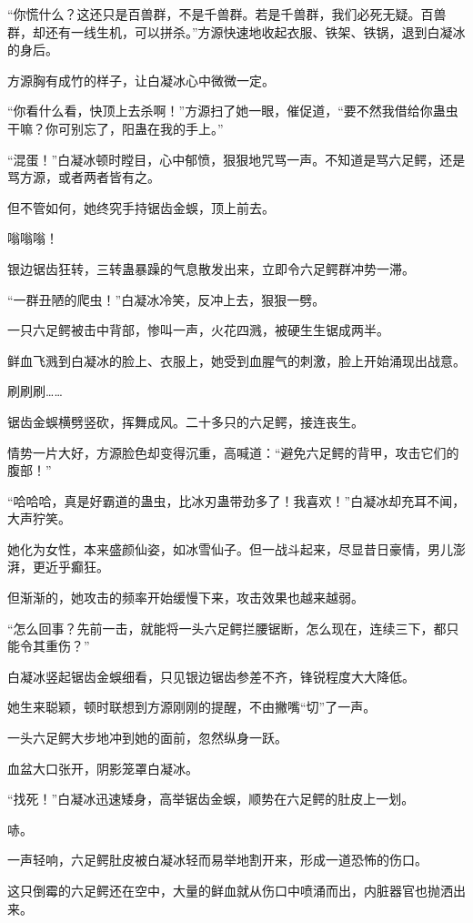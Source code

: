 \begin{this_body}
“你慌什么？这还只是百兽群，不是千兽群。若是千兽群，我们必死无疑。百兽群，却还有一线生机，可以拼杀。”方源快速地收起衣服、铁架、铁锅，退到白凝冰的身后。

方源胸有成竹的样子，让白凝冰心中微微一定。

“你看什么看，快顶上去杀啊！”方源扫了她一眼，催促道，“要不然我借给你蛊虫干嘛？你可别忘了，阳蛊在我的手上。”

“混蛋！”白凝冰顿时瞠目，心中郁愤，狠狠地咒骂一声。不知道是骂六足鳄，还是骂方源，或者两者皆有之。

但不管如何，她终究手持锯齿金蜈，顶上前去。

嗡嗡嗡！

银边锯齿狂转，三转蛊暴躁的气息散发出来，立即令六足鳄群冲势一滞。

“一群丑陋的爬虫！”白凝冰冷笑，反冲上去，狠狠一劈。

一只六足鳄被击中背部，惨叫一声，火花四溅，被硬生生锯成两半。

鲜血飞溅到白凝冰的脸上、衣服上，她受到血腥气的刺激，脸上开始涌现出战意。

刷刷刷……

锯齿金蜈横劈竖砍，挥舞成风。二十多只的六足鳄，接连丧生。

情势一片大好，方源脸色却变得沉重，高喊道：“避免六足鳄的背甲，攻击它们的腹部！”

“哈哈哈，真是好霸道的蛊虫，比冰刃蛊带劲多了！我喜欢！”白凝冰却充耳不闻，大声狞笑。

她化为女性，本来盛颜仙姿，如冰雪仙子。但一战斗起来，尽显昔日豪情，男儿澎湃，更近乎癫狂。

但渐渐的，她攻击的频率开始缓慢下来，攻击效果也越来越弱。

“怎么回事？先前一击，就能将一头六足鳄拦腰锯断，怎么现在，连续三下，都只能令其重伤？”

白凝冰竖起锯齿金蜈细看，只见银边锯齿参差不齐，锋锐程度大大降低。

她生来聪颖，顿时联想到方源刚刚的提醒，不由撇嘴“切”了一声。

一头六足鳄大步地冲到她的面前，忽然纵身一跃。

血盆大口张开，阴影笼罩白凝冰。

“找死！”白凝冰迅速矮身，高举锯齿金蜈，顺势在六足鳄的肚皮上一划。

哧。

一声轻响，六足鳄肚皮被白凝冰轻而易举地割开来，形成一道恐怖的伤口。

这只倒霉的六足鳄还在空中，大量的鲜血就从伤口中喷涌而出，内脏器官也抛洒出来。


\end{this_body}
